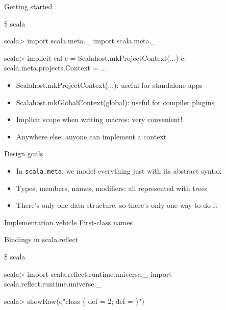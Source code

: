 \documentclass[svgnames,dvipsnames,hyperref={bookmarks=false},usepdftitle=false]{beamer}
\begin{document}

\begin{frame}[fragile]{Getting started}
\begin{semiverbatim}
\$ scala

scala> import scala.meta.\_
import scala.meta.\_

scala> implicit val c = Scalahost.mkProjectContext(...)
c: scala.meta.projects.Context = ...
\end{semiverbatim}

\vskip25pt
\begin{itemize}
\item<2-> Scalahost.mkProjectContext(...): useful for standalone apps
\item<3-> Scalahost.mkGlobalContext(global): useful for compiler plugins
\item<4-> Implicit scope when writing macros: very convenient!
\item<5-> Anywhere else: anyone can implement a context
\end{itemize}
\end{frame}

\begin{frame}{Design goals}
\begin{itemize}
\item In \texttt{scala.meta}, we model everything just with its abstract syntax
\item Types, members, names, modifiers: all represented with trees
\item There's only one data structure, so there's only one way to do it
\end{itemize}
\end{frame}

\begin{frame}{Implementation vehicle}
First-class names
\end{frame}

\begin{frame}[fragile]{Bindings in scala.reflect}
\begin{semiverbatim}
\small
\$ scala

scala> import scala.reflect.runtime.universe.\_
import scala.reflect.runtime.universe.\_

scala> showRaw(q"class  \{ def  = 2; def  =  \}")
\end{semiverbatim}
\end{frame}
\end{document}
